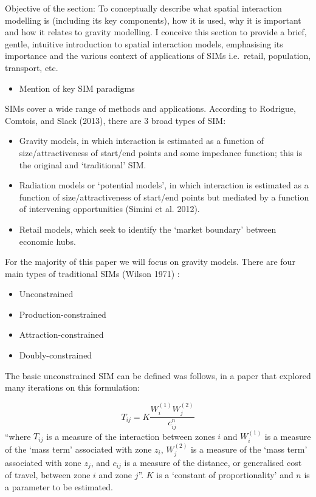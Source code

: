\documentclass[11pt,letterpaper]{article}
\providecommand{\tightlist}{%
  \setlength{\itemsep}{0pt}\setlength{\parskip}{0pt}}
\begin{document}
Objective of the section: To conceptually describe what spatial interaction modelling is (including its key components), how it is used, why it is important and how it relates to gravity modelling.
I conceive this section to provide a brief, gentle, intuitive introduction to spatial interaction models, emphasising its importance and the various context of applications of SIMs i.e.~retail, population, transport, etc.

\begin{itemize}
\tightlist
\item
  Mention of key SIM paradigms
\end{itemize}

SIMs cover a wide range of methods and applications.
According to Rodrigue, Comtois, and Slack (2013), there are 3 broad types of SIM:

\begin{itemize}
\item
  Gravity models, in which interaction is estimated as a function of size/attractiveness of start/end points and some impedance function; this is the original and `traditional' SIM.
\item
  Radiation models or `potential models', in which interaction is estimated as a function of size/attractiveness of start/end points but mediated by a function of intervening opportunities (Simini et al. 2012).
\item
  Retail models, which seek to identify the `market boundary' between economic hubs.
\end{itemize}

For the majority of this paper we will focus on gravity models.
There are four main types of traditional SIMs (Wilson 1971) :

\begin{itemize}
\item
  Unconstrained
\item
  Production-constrained
\item
  Attraction-constrained
\item
  Doubly-constrained
\end{itemize}

The basic unconstrained SIM can be defined was follows, in a paper that explored many iterations on this formulation:

\[
T_{i j}=K \frac{W_{i}^{(1)} W_{j}^{(2)}}{c_{i j}^{n}}
\] ``where \(T_{i j}\) is a measure of the interaction between zones \(i\) and \(W_{i}^{(1)}\) is a measure of the `mass term' associated with zone \(z_i\), \(W_{j}^{(2)}\) is a measure of the `mass term' associated with zone \(z_j\), and \(c_{ij}\) is a measure of the distance, or generalised cost of travel, between zone \(i\) and zone \(j\)''.
\(K\) is a `constant of proportionality' and \(n\) is a parameter to be estimated.
\end{document}
